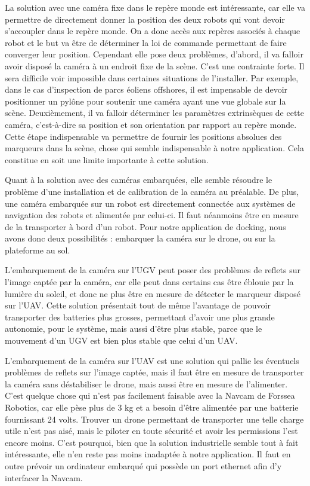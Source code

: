    La solution avec une caméra fixe dans le repère monde est intéressante, car elle va permettre de directement donner la position des deux robots qui vont devoir s’accoupler dans le repère monde. On a donc accès aux repères associés à chaque robot et le but va être de déterminer la loi de commande permettant de faire converger leur position. Cependant elle pose deux problèmes, d’abord, il va falloir avoir disposé la caméra à un endroit fixe de la scène. C’est une contrainte forte. Il sera difficile voir impossible dans certaines situations de l’installer. Par exemple, dans le cas d’inspection de parcs éoliens offshores, il est impensable de devoir positionner un pylône pour soutenir une caméra ayant une vue globale sur la scène. Deuxièmement, il va falloir déterminer les paramètres extrinsèques de cette caméra, c'est-à-dire sa position et son orientation par rapport au repère monde. Cette étape indispensable va permettre de fournir les positions absolues des marqueurs dans la scène, chose qui semble indispensable à notre application. Cela constitue en soit une limite importante à cette solution.
    
    Quant à la solution avec des caméras embarquées, elle semble résoudre le problème d’une installation et de calibration de la caméra au préalable. De plus, une caméra embarquée sur un robot est directement connectée aux systèmes de navigation des robots et alimentée par celui-ci. Il faut néanmoins être en mesure de la transporter à bord d’un robot. Pour notre application de docking, nous avons donc deux possibilités : embarquer la caméra sur le drone, ou sur la plateforme au sol. 

    L’embarquement de la caméra sur l’UGV peut poser des problèmes de reflets sur l’image captée par la caméra, car elle peut dans certains cas être éblouie par la lumière du soleil, et donc ne plus être en mesure de détecter le marqueur disposé sur l’UAV. Cette solution présentait tout de même l’avantage de pouvoir transporter des batteries plus grosses, permettant d’avoir une plus grande autonomie, pour le système, mais aussi d’être plus stable, parce que le mouvement d’un UGV est bien plus stable que celui d’un UAV.

    L’embarquement de la caméra sur l’UAV est une solution qui pallie les éventuels problèmes de reflets sur l’image captée, mais il faut être en mesure de transporter la caméra sans déstabiliser le drone, mais aussi être en mesure de l’alimenter. C’est quelque chose qui n’est pas facilement faisable avec la Navcam de Forssea Robotics, car elle pèse plus de 3 kg et a besoin d’être alimentée par une batterie fournissant 24 volts. Trouver un drone permettant de transporter une telle charge utile n’est pas aisé, mais le piloter en toute sécurité et avoir les permissions l’est encore moins. C’est pourquoi, bien que la solution industrielle semble tout à fait intéressante, elle n’en reste pas moins inadaptée à notre application. Il faut en outre prévoir un ordinateur embarqué qui possède un port ethernet afin d'y interfacer la Navcam.

